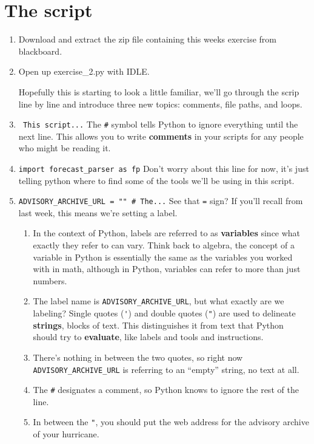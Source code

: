 \documentclass{article}
\begin{document}
\section{The script}
\begin{enumerate}
    \item Download and extract the zip file containing this weeks exercise from blackboard.  
    \item Open up exercise_2.py with IDLE.  
    
        Hopefully this is starting to look a little familiar, we'll go through the scrip line by line and introduce three new topics: comments, file paths, and loops.
    \item \verb+ This script...+ The \verb+#+ symbol tells Python to ignore everything until the next line.  This allows you to write \textbf{comments} in your scripts for any people who might be reading it.
    \item \verb+import forecast_parser as fp+ Don't worry about this line for now, it's just telling python where to find some of the tools we'll be using in this script.
    \item \verb+ADVISORY_ARCHIVE_URL = "" # The...+ See that \verb+=+ sign?  If you'll recall from last week, this means we're setting a label.  
    \begin{enumerate}
        \item In the context of Python, labels are referred to as \textbf{variables} since what exactly they refer to can vary.  Think back to algebra, the concept of a variable in Python is essentially the same as the variables you worked with in math, although in Python, variables can refer to more than just numbers.  
        \item The label name is \verb+ADVISORY_ARCHIVE_URL+, but what exactly are we labeling?  Single quotes (\verb+'+) and double quotes (\verb+"+) are used to delineate \textbf{strings}, blocks of text.   This distinguishes it from text that Python should try to \textbf{evaluate}, like labels and tools and instructions.  
        \item There's nothing in between the two quotes, so right now \verb+ADVISORY_ARCHIVE_URL+ is referring to an ``empty'' string, no text at all.  
        \item The \verb+#+ designates a comment, so Python knows to ignore the rest of the line.  
        \item In between the \verb+"+, you should put the web address for the advisory archive of your hurricane.  
    \end{enumerate}

\end{enumerate}
\end{document}
